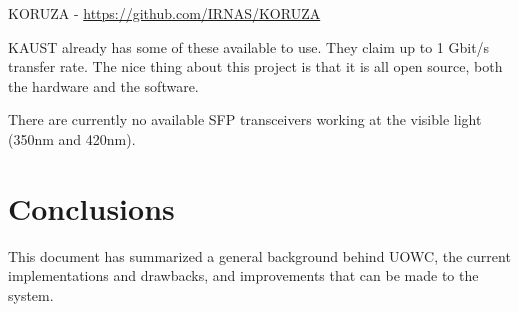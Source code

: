 \documentclass{article}
\begin{document}
KORUZA - \url{https://github.com/IRNAS/KORUZA}

KAUST already has some of these available to use. They claim up to 1 Gbit/s transfer rate. The nice thing about this project is that it is all open source, both the hardware and the software.

There are currently no available \ac{SFP} transceivers working at the visible light (350nm and 420nm).

\section{Conclusions}
This document has summarized a general background behind \ac{UOWC}, the current implementations and drawbacks, and improvements that can be made to the system.


\end{document}
